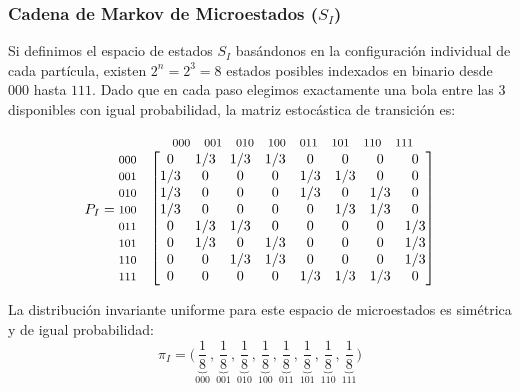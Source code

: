 \subsubsection{Cadena de Markov de Microestados ($S_I$)}
\noindent
Si definimos el espacio de estados $S_I$ basándonos en la configuración individual de cada partícula, existen $2^n = 2^3 = 8$ estados posibles indexados en binario desde $000$ hasta $111$. Dado que en cada paso elegimos exactamente una bola entre las 3 disponibles con igual probabilidad, la matriz estocástica de transición es:

\[
P_I = 
\begin{matrix}
    & \begin{matrix} \text{\footnotesize 000} & \text{\footnotesize 001} & \text{\footnotesize 010} & \text{\footnotesize 100} & \text{\footnotesize 011} & \text{\footnotesize 101} & \text{\footnotesize 110} & \text{\footnotesize 111} \end{matrix} \\
    \begin{matrix} \text{\footnotesize 000} \\ \text{\footnotesize 001} \\ \text{\footnotesize 010} \\ \text{\footnotesize 100} \\ \text{\footnotesize 011} \\ \text{\footnotesize 101} \\ \text{\footnotesize 110} \\ \text{\footnotesize 111} \end{matrix} &
    \begin{bmatrix}
        0 & 1/3 & 1/3 & 1/3 & 0 & 0 & 0 & 0 \\
        1/3 & 0 & 0 & 0 & 1/3 & 1/3 & 0 & 0 \\
        1/3 & 0 & 0 & 0 & 1/3 & 0 & 1/3 & 0 \\
        1/3 & 0 & 0 & 0 & 0 & 1/3 & 1/3 & 0 \\
        0 & 1/3 & 1/3 & 0 & 0 & 0 & 0 & 1/3 \\
        0 & 1/3 & 0 & 1/3 & 0 & 0 & 0 & 1/3 \\
        0 & 0 & 1/3 & 1/3 & 0 & 0 & 0 & 1/3 \\
        0 & 0 & 0 & 0 & 1/3 & 1/3 & 1/3 & 0
    \end{bmatrix}
\end{matrix}
\]

\noindent La distribución invariante uniforme para este espacio de microestados es simétrica y de igual probabilidad:
\begin{equation}
    \pi_I = \Big( \underbrace{\frac{1}{8}}_{000}, \underbrace{\frac{1}{8}}_{001}, \underbrace{\frac{1}{8}}_{010}, \underbrace{\frac{1}{8}}_{100}, \underbrace{\frac{1}{8}}_{011}, \underbrace{\frac{1}{8}}_{101}, \underbrace{\frac{1}{8}}_{110}, \underbrace{\frac{1}{8}}_{111} \Big)
\end{equation}

